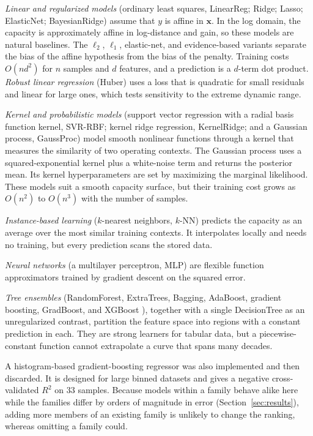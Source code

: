 \documentclass[correspondence]{IEEEtaes}
\begin{document}
\emph{Linear and regularized models} (ordinary least squares, LinearReg; Ridge; Lasso;
ElasticNet; BayesianRidge) assume that $y$ is affine in $\mathbf{x}$. In the log domain,
the capacity is approximately affine in log-distance and gain, so these models are
natural baselines. The $\ell_2$, $\ell_1$, elastic-net, and evidence-based variants
separate the bias of the affine hypothesis from the bias of the penalty. Training costs
$O(nd^2)$ for $n$ samples and $d$ features, and a prediction is a $d$-term dot product.
\emph{Robust linear regression} (Huber) uses a loss that is quadratic for small residuals
and linear for large ones, which tests sensitivity to the extreme dynamic range.

\emph{Kernel and probabilistic models} (support vector regression with a radial basis
function kernel, SVR-RBF; kernel ridge regression, KernelRidge; and a Gaussian process,
GaussProc) model smooth nonlinear functions through a kernel that measures the similarity
of two operating contexts. The Gaussian process \cite{rasmussen2006gp} uses a
squared-exponential kernel plus a white-noise term and returns the posterior mean. Its
kernel hyperparameters are set by maximizing the marginal likelihood. These models suit a
smooth capacity surface, but their training cost grows as $O(n^2)$ to $O(n^3)$ with the
number of samples.

\emph{Instance-based learning} ($k$-nearest neighbors, $k$-NN) predicts the capacity as an
average over the most similar training contexts. It interpolates locally and needs no
training, but every prediction scans the stored data.

\emph{Neural networks} (a multilayer perceptron, MLP) are flexible function approximators
trained by gradient descent on the squared error.

\emph{Tree ensembles} (RandomForest, ExtraTrees, Bagging, AdaBoost, gradient boosting,
GradBoost, and XGBoost \cite{chen2016xgboost}), together with a single DecisionTree as an
unregularized contrast, partition the feature space into regions with a constant
prediction in each. They are strong learners for tabular data, but a piecewise-constant
function cannot extrapolate a curve that spans many decades.

A histogram-based gradient-boosting regressor was also implemented and then discarded.
It is designed for large binned datasets and gives a negative cross-validated $R^2$ on
$33$ samples. Because models within a family behave alike here while the families differ
by orders of magnitude in error (Section~\ref{sec:results}), adding more members of an
existing family is unlikely to change the ranking, whereas omitting a family could.
\end{document}
